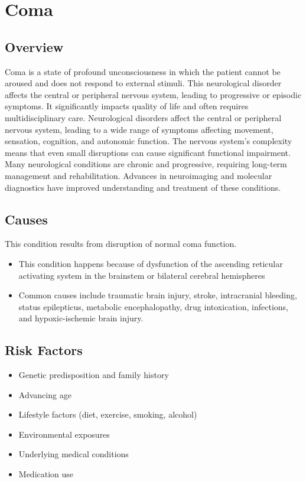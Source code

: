 \chapter{Coma}
\label{sec:Coma}

\section{Overview}
Coma is a state of profound unconsciousness in which the patient cannot be aroused and does not respond to external stimuli. This neurological disorder affects the central or peripheral nervous system, leading to progressive or episodic symptoms. It significantly impacts quality of life and often requires multidisciplinary care. Neurological disorders affect the central or peripheral nervous system, leading to a wide range of symptoms affecting movement, sensation, cognition, and autonomic function. The nervous system's complexity means that even small disruptions can cause significant functional impairment. Many neurological conditions are chronic and progressive, requiring long-term management and rehabilitation. Advances in neuroimaging and molecular diagnostics have improved understanding and treatment of these conditions.
\section{Causes}
This condition results from disruption of normal coma function.

\begin{itemize}[noitemsep]
  \item This condition happens because of dysfunction of the ascending reticular activating system in the brainstem or bilateral cerebral hemispheres
  \item Common causes include traumatic brain injury, stroke, intracranial bleeding, status epilepticus, metabolic encephalopathy, drug intoxication, infections, and hypoxic-ischemic brain injury.
\end{itemize}
\section{Risk Factors}
\begin{itemize}[noitemsep]
  \item Genetic predisposition and family history
  \item Advancing age
  \item Lifestyle factors (diet, exercise, smoking, alcohol)
  \item Environmental exposures
  \item Underlying medical conditions
  \item Medication use
\end{itemize}
